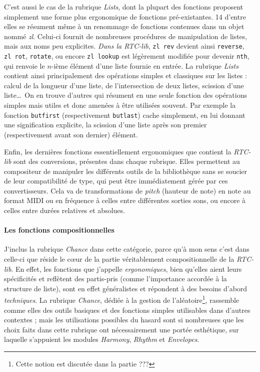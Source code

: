 \documentclass[a4paper,12pt]{article}
\begin{document}
C'est aussi le cas de la rubrique \emph{Lists}, dont la plupart des fonctions proposent simplement une forme plus ergonomique de fonctions pré-existantes. 14 d'entre elles se résument même à un renommage de fonctions contenues dans un objet nommé \emph{zl}. Celui-ci fournit de nombreuses procédures de manipulation de listes, mais aux noms peu explicites. \emph{Dans la RTC-lib}, \texttt{zl~rev} devient ainsi \texttt{reverse}, \texttt{zl~rot}, \texttt{rotate}, ou encore \texttt{zl~lookup} est légèrement modifiée pour devenir \texttt{nth}, qui renvoie le $n$-ième élément d'une liste fournie en entrée. La rubrique \emph{Lists} contient ainsi principalement des opérations simples et classiques sur les listes : calcul de la longueur d'une liste, de l'intersection de deux listes, scission d'une liste\dots~On en trouve d'autres qui résument en une seule fonction des opérations simples mais utiles et donc amenées à être utilisées souvent. Par exemple la fonction \texttt{butfirst} (respectivement \texttt{butlast}) cache simplement, en lui donnant une signification explicite, la scission d'une liste après son premier (respectivement avant son dernier) élément.

Enfin, les dernières fonctions essentiellement ergonomiques que contient la \emph{RTC-lib} sont des conversions, présentes dans chaque rubrique. Elles permettent au compositeur de manipuler les différents outils de la bibliothèque sans se soucier de leur compatibilité de type, qui peut être immédiatement gérée par ces convertisseurs. Cela va de transformations de \emph{pitch} (hauteur de note) en note au format MIDI ou en fréquence à celles entre différentes sorties sons, ou encore à celles entre durées relatives et absolues.

\paragraph{Les fonctions compositionnelles}

J'inclus la rubrique \emph{Chance} dans cette catégorie, parce qu'à mon sens c'est dans celle-ci que réside le cœur de la partie véritablement compositionnelle de la \emph{RTC-lib}. En effet, les fonctions que j'appelle \emph{ergonomiques}, bien qu'elles aient leurs spécificités et reflètent des partis-pris (comme l'importance accordée à la structure de liste), sont en effet généralistes et répondent à des besoins d'abord \emph{techniques}. La rubrique \emph{Chance}, dédiée à la gestion de l'aléatoire\footnote{Cette notion est discutée dans la partie ???}, rassemble comme elles des outils basiques et des fonctions simples utilisables dans d'autres contextes ; mais les utilisations possibles du hasard sont si nombreuses que les choix faits dans cette rubrique ont nécessairement une portée esthétique, sur laquelle s'appuient les modules \emph{Harmony}, \emph{Rhythm} et \emph{Envelopes}.
\end{document}
